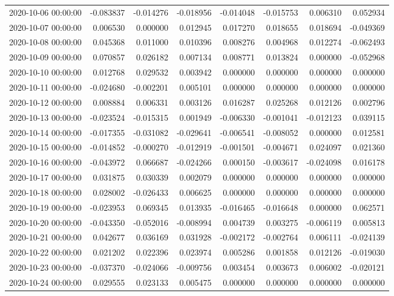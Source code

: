 \begin{tabular}{lrrrrrrr}
2020-10-06 00:00:00 & -0.083837 & -0.014276 & -0.018956 & -0.014048 & -0.015753 & 0.006310 & 0.052934 \\
2020-10-07 00:00:00 & 0.006530 & 0.000000 & 0.012945 & 0.017270 & 0.018655 & 0.018694 & -0.049369 \\
2020-10-08 00:00:00 & 0.045368 & 0.011000 & 0.010396 & 0.008276 & 0.004968 & 0.012274 & -0.062493 \\
2020-10-09 00:00:00 & 0.070857 & 0.026182 & 0.007134 & 0.008771 & 0.013824 & 0.000000 & -0.052968 \\
2020-10-10 00:00:00 & 0.012768 & 0.029532 & 0.003942 & 0.000000 & 0.000000 & 0.000000 & 0.000000 \\
2020-10-11 00:00:00 & -0.024680 & -0.002201 & 0.005101 & 0.000000 & 0.000000 & 0.000000 & 0.000000 \\
2020-10-12 00:00:00 & 0.008884 & 0.006331 & 0.003126 & 0.016287 & 0.025268 & 0.012126 & 0.002796 \\
2020-10-13 00:00:00 & -0.023524 & -0.015315 & 0.001949 & -0.006330 & -0.001041 & -0.012123 & 0.039115 \\
2020-10-14 00:00:00 & -0.017355 & -0.031082 & -0.029641 & -0.006541 & -0.008052 & 0.000000 & 0.012581 \\
2020-10-15 00:00:00 & -0.014852 & -0.000270 & -0.012919 & -0.001501 & -0.004671 & 0.024097 & 0.021360 \\
2020-10-16 00:00:00 & -0.043972 & 0.066687 & -0.024266 & 0.000150 & -0.003617 & -0.024098 & 0.016178 \\
2020-10-17 00:00:00 & 0.031875 & 0.030339 & 0.002079 & 0.000000 & 0.000000 & 0.000000 & 0.000000 \\
2020-10-18 00:00:00 & 0.028002 & -0.026433 & 0.006625 & 0.000000 & 0.000000 & 0.000000 & 0.000000 \\
2020-10-19 00:00:00 & -0.023953 & 0.069345 & 0.013935 & -0.016465 & -0.016648 & 0.000000 & 0.062571 \\
2020-10-20 00:00:00 & -0.043350 & -0.052016 & -0.008994 & 0.004739 & 0.003275 & -0.006119 & 0.005813 \\
2020-10-21 00:00:00 & 0.042677 & 0.036169 & 0.031928 & -0.002172 & -0.002764 & 0.006111 & -0.024139 \\
2020-10-22 00:00:00 & 0.021202 & 0.022396 & 0.023974 & 0.005286 & 0.001858 & 0.012126 & -0.019030 \\
2020-10-23 00:00:00 & -0.037370 & -0.024066 & -0.009756 & 0.003454 & 0.003673 & 0.006002 & -0.020121 \\
2020-10-24 00:00:00 & 0.029555 & 0.023133 & 0.005475 & 0.000000 & 0.000000 & 0.000000 & 0.000000 \\

\end{tabular}
